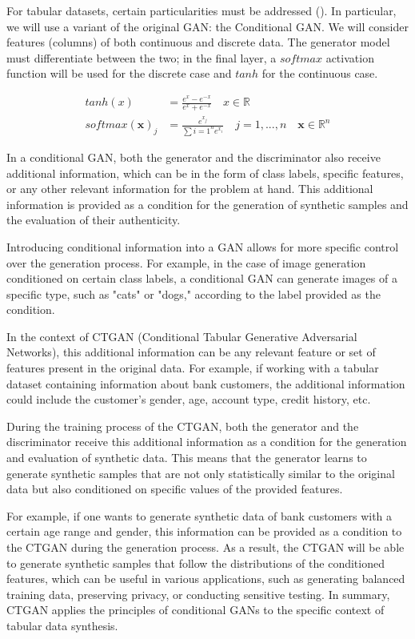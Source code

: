 For tabular datasets, certain particularities must be addressed (\cite*{xu2019}). In particular, we will use a variant of the original GAN: the Conditional GAN. We will consider features (columns) of both continuous and discrete data. The generator model must differentiate between the two; in the final layer, a $softmax$ activation function will be used for the discrete case and $tanh$ for the continuous case.

\begin{align*}
tanh(x) &= \frac{e^x - e^{-x}}{e^x + e^{-x}} \quad x \in \mathbb{R} \\
softmax (\mathbf{x})_j &= \frac{e^{x_j}}{\sum{i=1}^n e^{x_i}} \quad j=1,...,n \quad \mathbf{x} \in \mathbb{R}^n
\end{align*}

In a conditional GAN, both the generator and the discriminator also receive additional information, which can be in the form of class labels, specific features, or any other relevant information for the problem at hand. This additional information is provided as a condition for the generation of synthetic samples and the evaluation of their authenticity.

Introducing conditional information into a GAN allows for more specific control over the generation process. For example, in the case of image generation conditioned on certain class labels, a conditional GAN can generate images of a specific type, such as "cats" or "dogs," according to the label provided as the condition.

In the context of CTGAN (Conditional Tabular Generative Adversarial Networks), this additional information can be any relevant feature or set of features present in the original data. For example, if working with a tabular dataset containing information about bank customers, the additional information could include the customer's gender, age, account type, credit history, etc.

During the training process of the CTGAN, both the generator and the discriminator receive this additional information as a condition for the generation and evaluation of synthetic data. This means that the generator learns to generate synthetic samples that are not only statistically similar to the original data but also conditioned on specific values of the provided features.

For example, if one wants to generate synthetic data of bank customers with a certain age range and gender, this information can be provided as a condition to the CTGAN during the generation process. As a result, the CTGAN will be able to generate synthetic samples that follow the distributions of the conditioned features, which can be useful in various applications, such as generating balanced training data, preserving privacy, or conducting sensitive testing. In summary, CTGAN applies the principles of conditional GANs to the specific context of tabular data synthesis.

